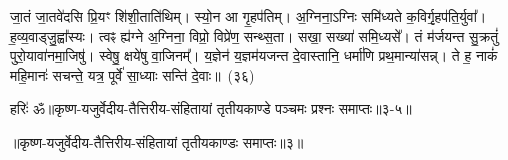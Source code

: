 जा॒तं जा॒तवे॑दसि प्रि॒यꣳ शि॑शी॒ताति॑थिम्। स्यो॒न आ गृ॒ह\-प॑तिम्। अ॒ग्निना॒\-ऽग्निः समि॑ध्यते क॒विर्गृ॒हप॑ति॒र्युवा᳚। ह॒व्य॒वाड्\-जु॒ह्वा᳚स्यः। त्वꣴ ह्य॑ग्ने अ॒ग्निना॒ विप्रो॒ विप्रे॑ण॒ सन्थ्स॒ता। सखा॒ सख्या॑ समि॒ध्यसे᳚। तं म॑र्जयन्त सु॒क्रतुं॑ पुरो॒यावा॑नमा॒जिषु॑। स्वेषु॒ क्षये॑षु वा॒जिनम्᳚। य॒ज्ञेन॑ य॒ज्ञम॑यजन्त दे॒वास्तानि॒ धर्मा॑णि प्रथ॒मान्या॑सन्न्। ते ह॒ नाकं॑ महि॒मानः॑ सचन्ते॒ यत्र॒ पूर्वे॑ सा॒ध्याः सन्ति॑ दे॒वाः॥~(३६)\ip

{\anuvakamend[{वोढ॑वे दू॒तस्त्वन्तमु॑ सीद॒त्वा यत्र॑ च॒त्वारि॑ च}]}%

{हरिः॑ ॐ}{॥कृष्ण-यजुर्वेदीय-तैत्तिरीय-संहितायां तृतीयकाण्डे पञ्चमः प्रश्नः समाप्तः॥३-५॥}

\centerline{॥कृष्ण-यजुर्वेदीय-तैत्तिरीय-संहितायां तृतीयकाण्डः समाप्तः॥३॥}

\medskip

\centerline{\hyperref[sec:startkanda3]{\closesection}}



\kandaend



